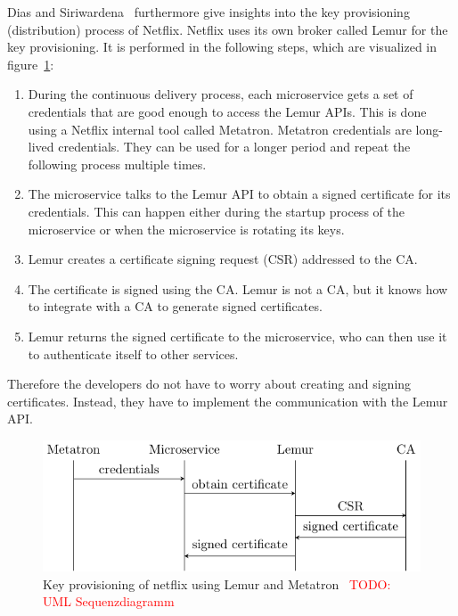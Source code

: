 Dias and Siriwardena~\cite{dias2020microservices} furthermore give insights into the key provisioning (distribution) process of Netflix.
Netflix uses its own broker called Lemur for the key provisioning.
It is performed in the following steps, which are visualized in figure~\ref{fig:key_provisioning_netflix}:
\begin{enumerate}
    \item During the continuous delivery process, each microservice gets a set of credentials that are good enough to access the Lemur APIs.
		This is done using a Netflix internal tool called Metatron.
		Metatron credentials are long-lived credentials. They can be used for a longer period and repeat the following process multiple times.
    \item The microservice talks to the Lemur API to obtain a signed certificate for its credentials.
		This can happen either during the startup process of the microservice or when the microservice is rotating its keys.
    \item Lemur creates a certificate signing request (CSR) addressed to the CA.
    \item The certificate is signed using the CA.
		Lemur is not a CA, but it knows how to integrate with a CA to generate signed certificates.
    \item Lemur returns the signed certificate to the microservice, who can then use it to authenticate itself to other services.
\end{enumerate}
Therefore the developers do not have to worry about creating and signing certificates.
Instead, they have to implement the communication with the Lemur API.


\begin{figure}
	\centering
	\includegraphics{images/related-work/netflix-provisioning.pdf}
	\caption{Key provisioning of netflix using Lemur and Metatron~\cite{dias2020microservices} \textcolor{red}{TODO: UML Sequenzdiagramm}}
	\label{fig:key_provisioning_netflix}
\end{figure}


